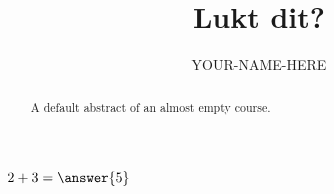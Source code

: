 \documentclass{ximera}
\title{Lukt dit?}
\author{YOUR-NAME-HERE}
\begin{document}
\begin{abstract}
    A default abstract of an almost empty course.
\end{abstract}
\maketitle


\begin{exercise}
    $2+3=\answer{5}$
\end{exercise}
\end{document}
